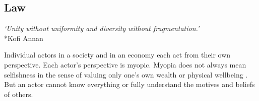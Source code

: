 \documentclass[12pt]{article}
\begin{document}









\subsection{Law}

\begin{center}
\textit{`Unity without uniformity and diversity without fragmentation.'}\\*Kofi Annan
\end{center}

Individual actors in a society and in an economy each act from their own perspective. Each actor's perspective is myopic. Myopia does not always mean selfishness in the sense of valuing only one's own wealth or physical wellbeing \citep{crockett2014harm, becker1974theory, henrich2001search}. But an actor cannot know everything or fully understand the motives and beliefs of others. 
\end{document}
